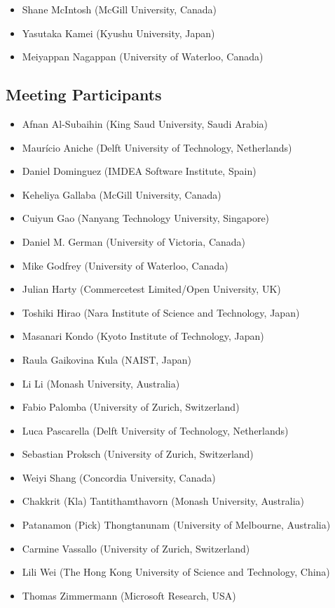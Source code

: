 \documentclass[a4paper]{article}
\begin{document}
\begin{itemize}
\item Shane McIntosh (McGill University, Canada)
\item Yasutaka Kamei (Kyushu University, Japan)
\item Meiyappan Nagappan (University of Waterloo, Canada)
\end{itemize}

\subsection{Meeting Participants}

\begin{itemize}
\item Afnan Al-Subaihin (King Saud University, Saudi Arabia)
\item Maur\'icio Aniche (Delft University of Technology, Netherlands)
\item Daniel Dominguez (IMDEA Software Institute, Spain)
\item Keheliya Gallaba (McGill University, Canada)
\item Cuiyun Gao (Nanyang Technology University, Singapore)
\item Daniel M. German (University of Victoria, Canada)
\item Mike Godfrey (University of Waterloo, Canada)
\item Julian Harty (Commercetest Limited/Open University, UK)
\item Toshiki Hirao (Nara Institute of Science and Technology, Japan)
\item Masanari Kondo (Kyoto Institute of Technology, Japan)
\item Raula Gaikovina Kula (NAIST, Japan)
\item Li Li (Monash University, Australia)
\item Fabio Palomba (University of Zurich, Switzerland)
\item Luca Pascarella (Delft University of Technology, Netherlands)
\item Sebastian Proksch (University of Zurich, Switzerland)
\item Weiyi Shang (Concordia University, Canada)
\item Chakkrit (Kla) Tantithamthavorn (Monash University, Australia)
\item Patanamon (Pick) Thongtanunam (University of Melbourne, Australia)
\item Carmine Vassallo (University of Zurich, Switzerland)
\item Lili Wei (The Hong Kong University of Science and Technology, China)
\item Thomas Zimmermann (Microsoft Research, USA)
\end{itemize}
\end{document}
